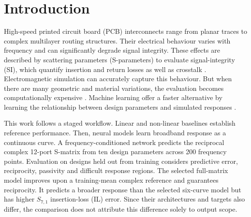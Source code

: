 \section{Introduction}
\label{sec:introduction}

High-speed printed circuit board (PCB) interconnects range from planar traces to complex
multilayer routing structures. Their electrical behaviour varies
with frequency and can significantly degrade signal integrity. These effects are
described by scattering parameters (S-parameters) to evaluate signal-integrity (SI),
which quantify insertion and return losses as well as crosstalk
\cite{pozar2011microwave}. Electromagnetic simulation can accurately capture this
behaviour. But when there are many geometric and material variations, the evaluation
becomes computationally expensive \cite{bruns2007numerical}. Machine learning offer a
faster alternative by learning the relationship between design parameters and simulated
responses \cite{swaminathan2020demystifying,akinwande2024complex}.

This work follows a staged workflow. Linear and non-linear baselines establish reference
performance. Then, neural models learn broadband response as a continuous curve. A
frequency-conditioned network predicts the reciprocal complex 12-port S-matrix from ten
design parameters across 200 frequency points. Evaluation on designs held out from
training considers predictive error, reciprocity, passivity and difficult response
regions. The selected full-matrix model improves upon a training-mean complex reference
and guarantees reciprocity. It predicts a broader response than the selected six-curve
model but has higher $S_{7,1}$ insertion-loss (IL) error. Since their architectures and
targets also differ, the comparison does not attribute this difference solely to output
scope.
